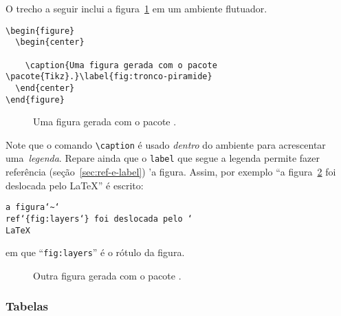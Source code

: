 O trecho a seguir inclui a figura~\ref{fig:tikz:piramide-cortada} em
um ambiente flutuador.

\begin{footnotesize}
\begin{verbatim}
\begin{figure}
  \begin{center}
    
    \caption{Uma figura gerada com o pacote \pacote{Tikz}.}\label{fig:tronco-piramide}
  \end{center}
\end{figure}
\end{verbatim}
\end{footnotesize}

\begin{figure}
  \begin{center}
    
    \caption{Uma figura gerada com o pacote .}\label{fig:tikz:piramide-cortada}
  \end{center}
\end{figure}

Note que o comando
\verb'\caption' é usado
\emph{dentro} do ambiente  para acrescentar
uma~\emph{legenda}. Repare
ainda que o \verb'label' que segue a legenda permite fazer referência
(seção~\ref{sec:ref-e-label}) 'a figura. Assim, por exemplo ``a
figura~\ref{fig:tikz:layers} foi deslocada
pelo \LaTeX'' é escrito: 
\begin{center}\footnotesize
\texttt{a
  figura\char`\~\char`\\ref\char`\{fig:layers\char`\}\ foi deslocada
  pelo \char`\\LaTeX}
\end{center}
em que ``\verb'fig:layers''' é o rótulo da figura.

\begin{figure}
  \begin{center}
    
    \caption{Outra figura gerada com o pacote .}\label{fig:tikz:layers}
  \end{center}
\end{figure}

\subsubsection{Tabelas}\label{sec:tabelas}


